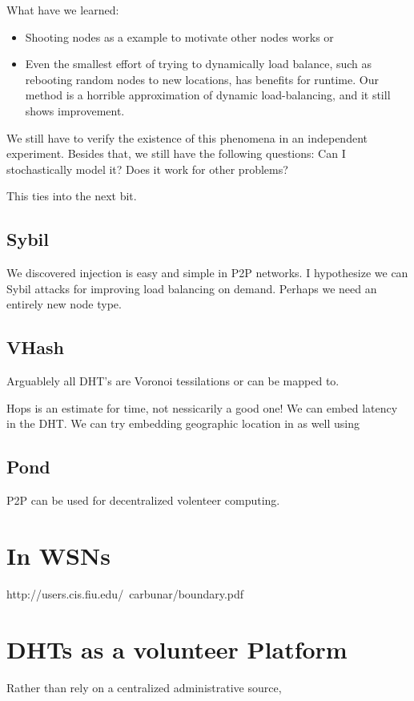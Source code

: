 \documentclass[10pt,letterpaper,twoside]{report}
\begin{document}
What have we learned:
\begin{itemize}
	\item Shooting nodes as a example to motivate other nodes works or
	\item Even the smallest effort of trying to dynamically load  balance, such as rebooting random nodes to new locations, has benefits for runtime.
	Our method is a horrible approximation of dynamic load-balancing, and it still shows improvement.
\end{itemize}



We still have to verify the existence of this phenomena in an independent experiment.
Besides that, we still have the following questions:
Can I stochastically model it?
Does it work for other problems?


This ties into the next bit.
\subsection{Sybil}
We discovered injection is easy and simple in P2P networks.
I hypothesize we can Sybil attacks for improving load balancing on demand.
Perhaps we need an entirely new node type.

\subsection{VHash}
Arguablely all DHT's are Voronoi tessilations or can be mapped to.


Hops is an estimate for time, not nessicarily a good one!
We can embed latency in the DHT.
We can try embedding geographic location in as well using




\subsection{Pond}
P2P can be used for decentralized volenteer computing.





\section{In WSNs}
http://users.cis.fiu.edu/~carbunar/boundary.pdf


\section{DHTs as a volunteer Platform}
Rather than rely on a centralized administrative source,
\end{document}
